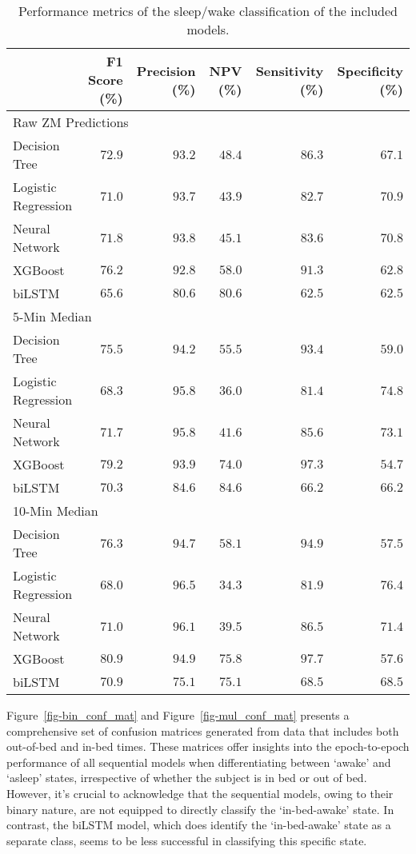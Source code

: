 \documentclass[
  10pt,
]{scrbook}
\begin{document}
\hypertarget{tbl-12}{}
\begin{longtable}{lrrrrr}
\caption{\label{tbl-12}Performance metrics of the sleep/wake classification of the included
models. }\tabularnewline

\toprule
 & F1 Score (\%) & Precision (\%) & NPV (\%) & Sensitivity (\%) & Specificity (\%) \\ 
\midrule
\multicolumn{6}{l}{Raw ZM Predictions} \\ 
\midrule
Decision Tree & $72.9$ & $93.2$ & $48.4$ & $86.3$ & $67.1$ \\ 
Logistic Regression & $71.0$ & $93.7$ & $43.9$ & $82.7$ & $70.9$ \\ 
Neural Network & $71.8$ & $93.8$ & $45.1$ & $83.6$ & $70.8$ \\ 
XGBoost & $76.2$ & $92.8$ & $58.0$ & $91.3$ & $62.8$ \\ 
biLSTM & $65.6$ & $80.6$ & $80.6$ & $62.5$ & $62.5$ \\ 
\midrule
\multicolumn{6}{l}{5-Min Median} \\ 
\midrule
Decision Tree & $75.5$ & $94.2$ & $55.5$ & $93.4$ & $59.0$ \\ 
Logistic Regression & $68.3$ & $95.8$ & $36.0$ & $81.4$ & $74.8$ \\ 
Neural Network & $71.7$ & $95.8$ & $41.6$ & $85.6$ & $73.1$ \\ 
XGBoost & $79.2$ & $93.9$ & $74.0$ & $97.3$ & $54.7$ \\ 
biLSTM & $70.3$ & $84.6$ & $84.6$ & $66.2$ & $66.2$ \\ 
\midrule
\multicolumn{6}{l}{10-Min Median} \\ 
\midrule
Decision Tree & $76.3$ & $94.7$ & $58.1$ & $94.9$ & $57.5$ \\ 
Logistic Regression & $68.0$ & $96.5$ & $34.3$ & $81.9$ & $76.4$ \\ 
Neural Network & $71.0$ & $96.1$ & $39.5$ & $86.5$ & $71.4$ \\ 
XGBoost & $80.9$ & $94.9$ & $75.8$ & $97.7$ & $57.6$ \\ 
biLSTM & $70.9$ & $75.1$ & $75.1$ & $68.5$ & $68.5$ \\ 
\bottomrule
\end{longtable}

\endgroup

Figure~\ref{fig-bin_conf_mat} and Figure~\ref{fig-mul_conf_mat} presents
a comprehensive set of confusion matrices generated from data that
includes both out-of-bed and in-bed times. These matrices offer insights
into the epoch-to-epoch performance of all sequential models when
differentiating between `awake' and `asleep' states, irrespective of
whether the subject is in bed or out of bed. However, it's crucial to
acknowledge that the sequential models, owing to their binary nature,
are not equipped to directly classify the `in-bed-awake' state. In
contrast, the biLSTM model, which does identify the `in-bed-awake' state
as a separate class, seems to be less successful in classifying this
specific state.
\end{document}
